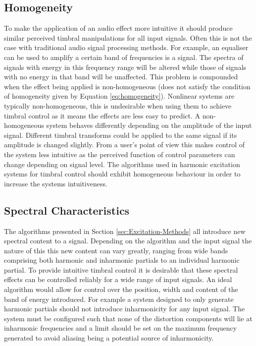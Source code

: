 	\subsection{Homogeneity}
	\label{sec:ExcitationEvaluation-Evaluation-Homogeneity}
		To make the application of an audio effect more intuitive it should produce similar perceived timbral
		manipulations for all input signals. Often this is not the case with traditional audio signal processing
		methods. For example, an equaliser can be used to amplify a certain band of frequencies is a signal. The
		spectra of signals with energy in this frequency range will be altered while those of signals with no energy
		in that band will be unaffected. This problem is compounded when the effect being applied is non-homogeneous
		(does not satisfy the condition of homogeneity given by Equation \ref{eq:homogeneity}). Nonlinear systems
		are typically non-homogeneous, this is undesirable when using them to achieve timbral control as it means
		the effects are less easy to predict. A non-homogeneous system behaves differently depending on the
		amplitude of the input signal. Different timbral transforms could be applied to the same signal if
		its amplitude is changed slightly. From a user's point of view this makes control of the system less
		intuitive as the perceived function of control parameters can change depending on signal level. The
		algorithms used in harmonic excitation systems for timbral control should exhibit homogeneous behaviour in
		order to increase the systems intuitiveness.

	\subsection{Spectral Characteristics}
	\label{sec:ExcitationEvaluation-Evaluation-SpectralCharacteristics}
		The algorithms presented in Section \ref{sec:Excitation-Methods} all introduce new spectral content to a
		signal. Depending on the algorithm and the input signal the nature of this this new content can vary
		greatly, ranging from wide bands comprising both harmonic and inharmonic partials to an individual harmonic
		partial. To provide intuitive timbral control it is desirable that these spectral effects can be controlled
		reliably for a wide range of input signals. An ideal algorithm would allow for control over the position,
		width and content of the band of energy introduced. For example a system designed to only generate harmonic
		partials should not introduce inharmonicity for any input signal. The system must be configured such that
		none of the distortion components will lie at inharmonic frequencies and a limit should be set on the
		maximum frequency generated to avoid aliasing being a potential source of inharmonicity.

